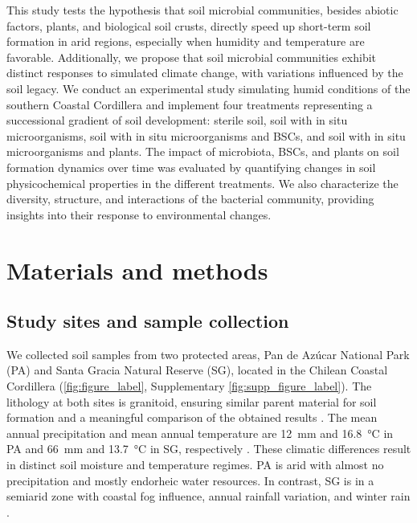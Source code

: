 This study tests the hypothesis that soil microbial communities, besides abiotic factors, plants, and biological soil crusts, directly speed up short-term soil formation in arid regions, especially when humidity and temperature are favorable. Additionally, we propose that soil microbial communities exhibit distinct responses to simulated climate change, with variations influenced by the soil legacy. We conduct an experimental study simulating humid conditions of the southern Coastal Cordillera and implement four treatments representing a successional gradient of soil development: sterile soil, soil with in situ microorganisms, soil with in situ microorganisms and BSCs, and soil with in situ microorganisms and plants. The impact of microbiota, BSCs, and plants on soil formation dynamics over time was evaluated by quantifying changes in soil physicochemical properties in the different treatments. We also characterize the diversity, structure, and interactions of the bacterial community, providing insights into their response to environmental changes.

\section{Materials and methods}
\subsection{Study sites and sample collection}

We collected soil samples from two protected areas, Pan de Az{\'u}car National Park (PA) and Santa Gracia Natural Reserve (SG), located in the Chilean Coastal Cordillera (\cref{fig:figure_label}, Supplementary \cref{fig:supp_figure_label}). 
The lithology at both sites is granitoid, ensuring similar parent material for soil formation and a meaningful comparison of the obtained results \citep{Bernhard2018, Oeser2018}. 
The mean annual precipitation and mean annual temperature are \SI{12}{\milli\metre} and \SI{16.8}{\degreeCelsius} in PA and \SI{66}{\milli\metre} and \SI{13.7}{\degreeCelsius} in SG, respectively \citep{Munoz2007}. 
These climatic differences result in distinct soil moisture and temperature regimes. 
PA is arid with almost no precipitation and mostly endorheic water resources. 
In contrast, SG is in a semiarid zone with coastal fog influence, annual rainfall variation, and winter rain \citep{Bernhard2018}.


